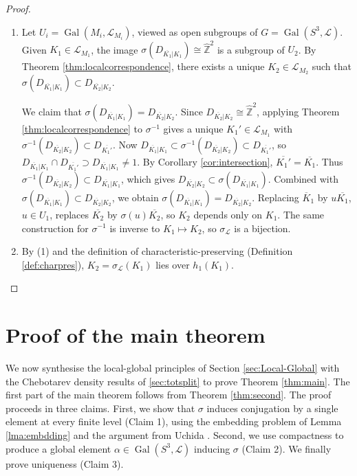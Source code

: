 \documentclass{amsart}
\theoremstyle{plain}
\theoremstyle{definition}
\theoremstyle{plain}
\theoremstyle{plain}
\theoremstyle{plain}
\theoremstyle{remark}
\theoremstyle{remark}
\theoremstyle{plain}
\theoremstyle{definition}
\theoremstyle{plain}
\DeclareMathOperator{\Gal}{\mathrm{Gal}}
\newcounter{main}
\theoremstyle{plain}
\theoremstyle{plain}
\numberwithin{equation}{section}
\begin{document}
\begin{proof}
\begin{enumerate}
    \item Let $U_i = \Gal(M_i, \mathcal{L}_{M_i})$, viewed as open subgroups of $G = \Gal(S^3, \mathcal{L})$. Given $K_1 \in \mathcal{L}_{M_1}$, the image $\sigma(D_{\overline{K_1}|K_1}) \cong \widehat{\mathbb{Z}}^2$ is a subgroup of $U_2$. By Theorem \ref{thm:localcorrespondence}, there exists a unique $K_2 \in \mathcal{L}_{M_2}$ such that $\sigma(D_{\overline{K_1}|K_1}) \subset D_{\overline{K_2}|K_2}$.
    
    \medskip
    
    We claim that $\sigma(D_{\overline{K_1}|K_1}) = D_{\overline{K_2}|K_2}$. Since $D_{\overline{K_2}|K_2} \cong \widehat{\mathbb{Z}}^2$, applying Theorem \ref{thm:localcorrespondence} to $\sigma^{-1}$ gives a unique $K_1' \in \mathcal{L}_{M_1}$ with $\sigma^{-1}(D_{\overline{K_2}|K_2}) \subset D_{\overline{K_1'}}$. Now $D_{\overline{K_1}|K_1} \subset \sigma^{-1}(D_{\overline{K_2}|K_2}) \subset D_{\overline{K_1'}}$, so $D_{\overline{K_1}|K_1} \cap D_{\overline{K_1'}} \supset D_{\overline{K_1}|K_1} \neq 1$. By Corollary \ref{cor:intersection}, $\overline{K_1'} = \overline{K_1}$. Thus $\sigma^{-1}(D_{\overline{K_2}|K_2}) \subset D_{\overline{K_1}|K_1}$, which gives $D_{\overline{K_2}|K_2} \subset \sigma(D_{\overline{K_1}|K_1})$. Combined with $\sigma(D_{\overline{K_1}|K_1}) \subset D_{\overline{K_2}|K_2}$, we obtain $\sigma(D_{\overline{K_1}|K_1}) = D_{\overline{K_2}|K_2}$. Replacing $\overline K_1$ by $u\overline{K_1}$, $u \in U_1$, replaces $\overline{K_2}$ by $\sigma(u)\overline{K_2}$, so $K_2$ depends only on $K_1$. The same construction for $\sigma^{-1}$ is inverse to $K_1 \mapsto K_2$, so $\sigma_{\mathcal L}$ is a bijection.
    \item By (1) and the definition of characteristic-preserving (Definition \ref{def:charpres}), $K_2 = \sigma_{\mathcal L}(K_1)$ lies over $h_1(K_1)$.
\end{enumerate} 
\end{proof}

\section{Proof of the main theorem}\label{sec:proof}

We now synthesise the local-global principles of Section \ref{sec:Local-Global} with the Chebotarev density results of \ref{sec:totsplit} to prove Theorem \ref{thm:main}. The first part of the main theorem follows from Theorem \ref{thm:second}. The proof proceeds in three claims. First, we show that $\sigma$ induces conjugation by a single element at every finite level (Claim 1), using the embedding problem of Lemma \ref{lma:embdding} and the argument from Uchida \cite{uchida}. Second, we use compactness to produce a global element $\alpha \in \Gal(S^3, \mathcal{L})$ inducing $\sigma$ (Claim 2). We finally prove uniqueness (Claim 3).  
\end{document}
